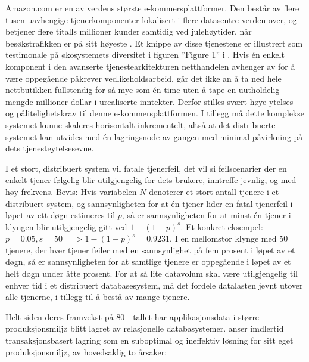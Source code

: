 Amazon.com er en av verdens største e-kommersplattformer. Den består av flere tusen uavhengige tjenerkomponenter lokalisert i flere datasentre verden over, og betjener flere titalls millioner kunder samtidig ved julehøytider, når besøkstrafikken er på sitt høyeste \citep{pepitone2010}. Et knippe av disse tjenestene er illustrert som testimonale på økosystemets diversitet i figuren ''Figure 1'' i \citep{decandia2007}. Hvis én enkelt komponent i den avanserte tjenestearkitekturen netthandelen avhenger av for å være oppegående påkrever vedlikeholdsarbeid, går det ikke an å ta ned hele nettbutikken fullstendig for så mye som én time uten å tape en uutholdelig mengde millioner dollar i urealiserte inntekter. Derfor stilles svært høye ytelses - og pålitelighetskrav til denne e-kommersplattformen. I tillegg må dette komplekse systemet kunne skaleres horisontalt inkrementelt, altså at det distribuerte systemet kan utvides med én lagringsnode av gangen med minimal påvirkning på dets tjenesteytelsesevne.

I et stort, distribuert system vil fatale tjenerfeil, det vil si feilscenarier der en enkelt tjener følgelig blir utilgjengelig for dets brukere, inntreffe jevnlig, og med høy frekvens. Bevis: Hvis variabelen \(N\) denoterer et stort antall tjenere i et distribuert system, og sannsynligheten for at én tjener lider en fatal tjenerfeil i løpet av ett døgn estimeres til \(p\), så er sannsynligheten for at minst én tjener i klyngen blir utilgjengelig gitt ved \(1-(1-p)^s\). Et konkret eksempel: \(p=0.05, s=50 => 1-(1-p)^s=0.9231\). I en mellomstor klynge med 50 tjenere, der hver tjener feiler med en sannsynlighet på fem prosent i løpet av et døgn, så er sannsynligheten for at samtlige tjenere er oppegående i løpet av et helt døgn under åtte prosent. For at så lite datavolum skal være utilgjengelig til enhver tid i et distribuert databasesystem, må det fordele datalasten jevnt utover alle tjenerne, i tillegg til å bestå av mange tjenere.

Helt siden deres framvekst på 80 - tallet har applikasjonsdata i større produksjonsmiljø blitt lagret av relasjonelle databasystemer. \cite{decandia2007} anser imdlertid transaksjonsbasert lagring som en suboptimal og ineffektiv løsning for sitt eget produksjonsmiljø, av hovedsaklig to årsaker:

